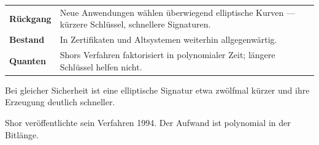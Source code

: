 \begin{forschung}
\begin{center}
{\small
\renewcommand{\arraystretch}{1.45}
\begin{tabular}{@{}P{2.8cm}P{5.4cm}@{}}
\toprule
\textbf{Rückgang} & Neue Anwendungen wählen überwiegend elliptische Kurven --- kürzere Schlüssel, schnellere Signaturen.\\
\textbf{Bestand} & In Zertifikaten und Altsystemen weiterhin allgegenwärtig.\\
\textbf{Quanten} & Shors Verfahren faktorisiert in polynomialer Zeit; längere Schlüssel helfen nicht.\\
\bottomrule
\end{tabular}}
\end{center}

Bei gleicher Sicherheit ist eine elliptische Signatur etwa zwölfmal kürzer und ihre Erzeugung deutlich schneller.

\begin{center}
\begin{minipage}{0.88\textwidth}
\end{minipage}
\end{center}

Shor veröffentlichte sein Verfahren 1994. Der Aufwand ist polynomial in der Bitlänge.

\begin{center}
\begin{minipage}{0.88\textwidth}
\end{minipage}
\end{center}
\end{forschung}


